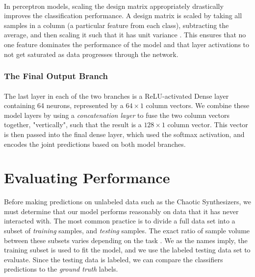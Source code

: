 \documentclass[12pt,letterpaper]{article}
\begin{document}
\paragraph*{}In perceptron models, scaling the design matrix appropriately drastically improves the classification performance. A design matrix is scaled by taking all samples in a column (a particular feature from each class), subtracting the average, and then scaling it such that it has unit variance \cite{Geron,James}. This ensures that no one feature dominates the performance of the model and that layer activations to not get saturated as data progresses through the network.


\subsubsection{The Final Output Branch}

\paragraph*{}The last layer in each of the two branches is a ReLU-activated Dense layer containing 64 neurons, represented by a $64 \times 1$ column vectors. We combine these model layers by using a \textit{concatenation layer} to fuse the two column vectors together, "vertically", such that the result is a $128 \times 1$ column vector. This vector is then passed into the final dense layer, which used the softmax activation, and encodes the joint predictions based on both model branches. 


\newpage
\section{Evaluating Performance}
\label{sec-PerfEval}

\paragraph*{}Before making predictions on unlabeled data such as the Chaotic Synthesizers, we must determine that our model performs reasonably on data that it has never interacted with. The most common practice is to divide a full data set into a subset of \textit{training} samples, and \textit{testing} samples. The exact ratio of sample volume between these subsets varies depending on the task \cite{Goodfellow,Geron2,Mitchell}. We as the names imply, the training subset is used to fit the model, and we use the labeled testing data set to evaluate. Since the testing data is labeled, we can compare the classifiers predictions to the \textit{ground truth} labels.
\end{document}
